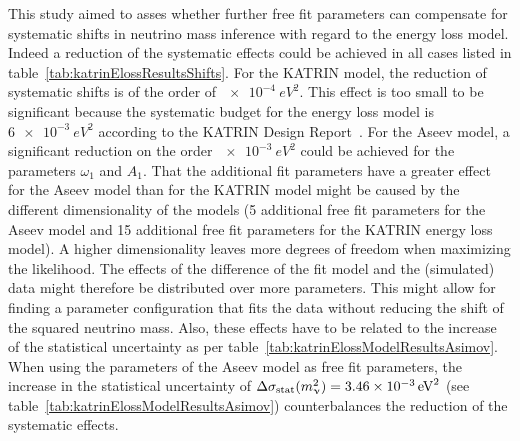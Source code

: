 This study aimed to asses whether further free fit parameters can compensate for systematic shifts in neutrino mass inference with regard to the energy loss model. Indeed a reduction of the systematic effects could be achieved in all cases listed in table~\ref{tab:katrinElossResultsShifts}. For the KATRIN model, the reduction of systematic shifts is of the order of $\SI{e-4}{eV^2}$. This effect is too small to be significant because the systematic budget for the energy loss model is $\SI{6e-3}{eV^2}$ according to the KATRIN Design Report~\cite{Angrik:2005ep}. For the Aseev model, a significant reduction on the order $\SI{e-3}{eV^2}$ could be achieved for the parameters $\omega_1$ and $A_1$. That the additional fit parameters have a greater effect for the Aseev model than for the KATRIN model might be caused by the different dimensionality of the models (5 additional free fit parameters for the Aseev model and 15 additional free fit parameters for the KATRIN energy loss model). A higher dimensionality leaves more degrees of freedom when maximizing the likelihood. The effects of the difference of the fit model and the (simulated) data might therefore be distributed over more parameters. This might allow for finding a parameter configuration that fits the data without reducing the shift of the squared neutrino mass. Also, these effects have to be related to the increase of the statistical uncertainty as per table~\ref{tab:katrinElossModelResultsAsimov}. When using the parameters of the Aseev model as free fit parameters, the increase in the statistical uncertainty of $\Delta\sigma_\mathrm{stat}(m_\upnu^2)=\SI{3.46e-3}{eV^2}$ (see table~\ref{tab:katrinElossModelResultsAsimov}) counterbalances the reduction of the systematic effects.

